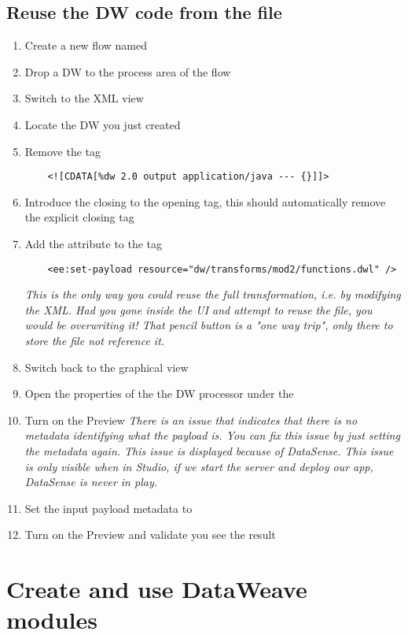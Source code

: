 \subsection{Reuse the DW code from the file}
\begin{enumerate}[resume*]
\item Create a new flow named 
\item Drop a DW to the process area of the flow
\item Switch to the XML view
\item Locate the DW you just created
\item Remove the  tag
  \begin{verbatim}
    <![CDATA[%dw 2.0 output application/java --- {}]]>
  \end{verbatim}
\item Introduce the \ttt{/} closing to the opening  tag, this should automatically remove the explicit closing tag
\item Add the attribute  to the  tag
  \begin{verbatim}
    <ee:set-payload resource="dw/transforms/mod2/functions.dwl" />
  \end{verbatim}
  \emph{
    This is the only way you could reuse the full transformation, i.e. by modifying the XML.  Had you gone inside
    the UI and attempt to reuse the file, you would be overwriting it!  That pencil button is a "one way trip",
    only there to store the file not reference it.
  }
\item Switch back to the graphical view
\item Open the properties of the the DW processor under the 
\item Turn on the Preview
  \emph{
    There is an issue that indicates that there is no metadata identifying what the payload is.  You can fix
    this issue by just setting the metadata again.  This issue is displayed because of DataSense.  This issue
    is only visible when in Studio, if we start the server and deploy our app, DataSense is never in play. 
  }
\item Set the input payload metadata to 
\item Turn on the Preview and validate you see the result
\end{enumerate}



\section{Create and use DataWeave modules}



